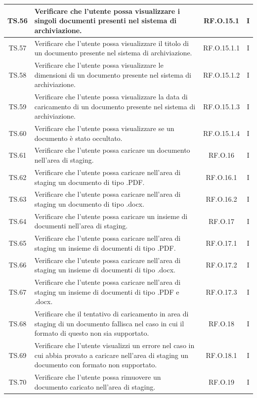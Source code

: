 \documentclass[10pt, a4paper]{article}
\begin{document}
\begin{xltabular}{\textwidth}{|c|X|c|c|}
\hline
TS.56 & Verificare che l'utente possa visualizzare i singoli documenti presenti nel sistema di archiviazione. & RF.O.15.1 & I \\
\hline
TS.57 & Verificare che l'utente possa visualizzare il titolo di un documento presente nel sistema di archiviazione. & RF.O.15.1.1 & I \\
\hline
TS.58 & Verificare che l'utente possa visualizzare le dimensioni di un documento presente nel sistema di archiviazione. & RF.O.15.1.2 & I \\
\hline
TS.59 & Verificare che l'utente possa visualizzare la data di caricamento di un documento presente nel sistema di archiviazione. & RF.O.15.1.3 & I \\
\hline
TS.60 & Verificare che l'utente possa visualizzare se un documento è stato occultato. & RF.O.15.1.4 & I \\
\hline
TS.61 & Verificare che l'utente possa caricare un documento nell’area di staging. & RF.O.16 & I \\
\hline
TS.62 & Verificare che l'utente possa caricare nell’area di staging un documento di tipo .PDF. & RF.O.16.1 & I \\
\hline
TS.63 & Verificare che l'utente possa caricare nell’area di staging un documento di tipo .docx. & RF.O.16.2 & I \\
\hline
TS.64 & Verificare che l'utente possa caricare un insieme di documenti nell’area di staging. & RF.O.17 & I \\
\hline
TS.65 & Verificare che l'utente possa caricare nell’area di staging un insieme di documenti di tipo .PDF. & RF.O.17.1 & I \\
\hline
TS.66 & Verificare che l'utente possa caricare nell’area di staging un insieme di documenti di tipo .docx. & RF.O.17.2 & I \\
\hline
TS.67 & Verificare che l'utente possa caricare nell’area di staging un insieme di documenti di tipo .PDF e .docx. & RF.O.17.3 & I \\
\hline
TS.68 & Verificare che il tentativo di caricamento in area di staging di un documento fallisca nel caso in cui il formato di questo non sia supportato. & RF.O.18 & I \\
\hline
TS.69 & Verificare che l'utente visualizzi un errore nel caso in cui abbia provato a caricare nell’area di staging un documento con formato non supportato. & RF.O.18.1 & I \\
\hline
TS.70 & Verificare che l'utente possa rimuovere un documento caricato nell’area di staging. & RF.O.19 & I \\

\end{xltabular}
\end{document}
